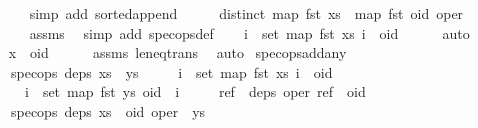 \begin{isabellebody}
\ \ \ \ \isamarkupfalse%
\ {\isacharparenleft}simp\ add{\isacharcolon}\ sorted{\isacharunderscore}append{\isacharparenright}\isanewline
\ \ \isamarkupfalse%
\ \isamarkupfalse%
\ {\isachardoublequoteopen}distinct\ {\isacharparenleft}{\isacharparenleft}map\ fst\ xs{\isacharparenright}\ {\isacharat}\ {\isacharparenleft}map\ fst\ {\isacharbrackleft}{\isacharparenleft}oid{\isacharcomma}\ oper{\isacharparenright}{\isacharbrackright}{\isacharparenright}{\isacharparenright}{\isachardoublequoteclose}\isanewline
\ \ \ \ \isamarkupfalse%
\ assms{\isacharparenleft}{}{\isacharparenright}\ \isamarkupfalse%
\ {\isacharparenleft}simp\ add{\isacharcolon}\ spec{\isacharunderscore}ops{\isacharunderscore}def{\isacharparenright}\isanewline
\ \ \isamarkupfalse%
\ {\isachardoublequoteopen}{\isasymforall}i\ {\isasymin}\ set\ {\isacharparenleft}map\ fst\ xs{\isacharparenright}{\isachardot}\ i\ {\isasymnoteq}\ oid{\isachardoublequoteclose}\isanewline
\ \ \ \ \isamarkupfalse%
\ auto\isanewline
\ \ \isamarkupfalse%
\ \isamarkupfalse%
\ {\isachardoublequoteopen}x\ {\isacharless}\ oid{\isachardoublequoteclose}\isanewline
\ \ \ \ \isamarkupfalse%
\ assms{\isacharparenleft}{}{\isacharparenright}\ le{\isacharunderscore}neq{\isacharunderscore}trans\ \isamarkupfalse%
\ auto\isanewline
{}\isamarkupfalse%
%
\endisatagproof
{\isafoldproof}%
%
\isadelimproof
\isanewline
%
\endisadelimproof
\isanewline
{}\isamarkupfalse%
\ spec{\isacharunderscore}ops{\isacharunderscore}add{\isacharunderscore}any{\isacharcolon}\isanewline
\ \ \ {\isachardoublequoteopen}spec{\isacharunderscore}ops\ deps\ {\isacharparenleft}xs\ {\isacharat}\ ys{\isacharparenright}{\isachardoublequoteclose}\isanewline
\ \ \ \ \ {\isachardoublequoteopen}{\isasymforall}i\ {\isasymin}\ set\ {\isacharparenleft}map\ fst\ xs{\isacharparenright}{\isachardot}\ i\ {\isacharless}\ oid{\isachardoublequoteclose}\isanewline
\ \ \ \ \ {\isachardoublequoteopen}{\isasymforall}i\ {\isasymin}\ set\ {\isacharparenleft}map\ fst\ ys{\isacharparenright}{\isachardot}\ oid\ {\isacharless}\ i{\isachardoublequoteclose}\isanewline
\ \ \ \ \ {\isachardoublequoteopen}{\isasymforall}ref\ {\isasymin}\ deps\ oper{\isachardot}\ ref\ {\isacharless}\ oid{\isachardoublequoteclose}\isanewline
\ \ \ {\isachardoublequoteopen}spec{\isacharunderscore}ops\ deps\ {\isacharparenleft}xs\ {\isacharat}\ {\isacharbrackleft}{\isacharparenleft}oid{\isacharcomma}\ oper{\isacharparenright}{\isacharbrackright}\ {\isacharat}\ ys{\isacharparenright}{\isachardoublequoteclose}\isanewline

\end{isabellebody}
